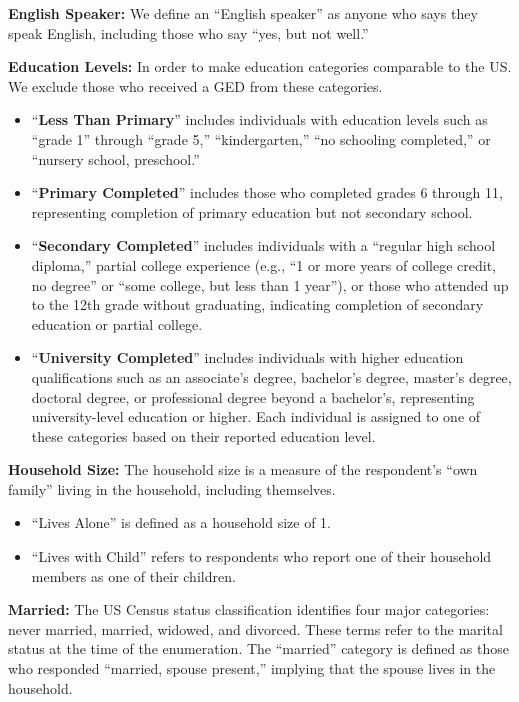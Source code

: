 \documentclass[
]{article}
\begin{document}
\textbf{English Speaker:} We define an ``English speaker'' as anyone who
says they speak English, including those who say ``yes, but not well.''

\textbf{Education Levels:} In order to make education categories
comparable to the US. We exclude those who received a GED from these
categories.

\begin{itemize}
\item
  ``\textbf{Less Than Primary}'' includes individuals with education
  levels such as ``grade 1'' through ``grade 5,'' ``kindergarten,'' ``no
  schooling completed,'' or ``nursery school, preschool.''
\item
  ``\textbf{Primary Completed}'' includes those who completed grades 6
  through 11, representing completion of primary education but not
  secondary school.
\item
  ``\textbf{Secondary Completed}'' includes individuals with a ``regular
  high school diploma,'' partial college experience (e.g., ``1 or more
  years of college credit, no degree'' or ``some college, but less than
  1 year''), or those who attended up to the 12th grade without
  graduating, indicating completion of secondary education or partial
  college.
\item
  ``\textbf{University Completed}'' includes individuals with higher
  education qualifications such as an associate's degree, bachelor's
  degree, master's degree, doctoral degree, or professional degree
  beyond a bachelor's, representing university-level education or
  higher. Each individual is assigned to one of these categories based
  on their reported education level.
\end{itemize}

\textbf{Household Size:} The household size is a measure of the
respondent's ``own family'' living in the household, including
themselves.

\begin{itemize}
\item
  ``Lives Alone'' is defined as a household size of 1.
\item
  ``Lives with Child'' refers to respondents who report one of their
  household members as one of their children.
\end{itemize}

\textbf{Married:} The US Census status classification identifies four
major categories: never married, married, widowed, and divorced. These
terms refer to the marital status at the time of the enumeration. The
``married'' category is defined as those who responded ``married, spouse
present,'' implying that the spouse lives in the household.
\end{document}
